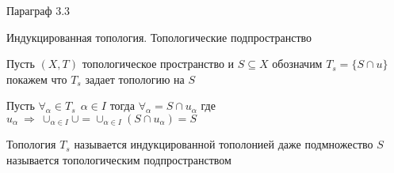 \begin{title}[\Large]
  Параграф 3.3
\end{title}

\begin{title}[\Large]
  Индукцированная топология. Топологические подпространство
\end{title}

Пусть $(X, T)$ топологическое пространство и $S \subseteq X$ обозначим
$T_s = \{ S \cap u\}$ покажем что $T_s$ задает топологию на $S$

Пусть $\forall_{\alpha} \in T_s ~~ \alpha \in I$ тогда $ \forall_{\alpha} = S
\cap u_{\alpha}$ где $u_{\alpha} ~ \Rightarrow ~ \cup_{\alpha \in I} \cup =
\cup_{\alpha \in I}(S \cap u_{\alpha}) = S$

\begin{define}
  Топология $T_s$ называется индукцированной тополонией даже подмножество $S$
  называется топологическим подпространством
\end{define}
